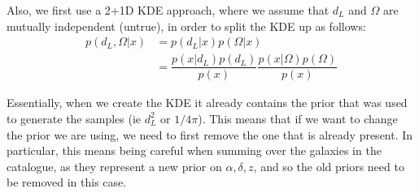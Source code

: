 \documentclass[a4paper,10pt]{article}
\begin{document}
Also, we first use a 2+1D KDE approach, where we assume that $d_L$ and $\Omega$ are mutually independent (untrue), in order to split the KDE up as follows:
\begin{equation}
\begin{aligned}
p(d_L,\Omega|x) &= p(d_L|x) p(\Omega|x)
\\ &= \dfrac{p(x|d_L) p(d_L)}{p(x)} \dfrac{p(x|\Omega) p(\Omega)}{p(x)}
\end{aligned}
\end{equation}

Essentially, when we create the KDE it already contains the prior that was used to generate the samples (ie $d_L^2$ or $1/4\pi$).  This means that if we want to change the prior we are using, we need to first remove the one that is already present.  In particular, this means being careful when summing over the galaxies in the catalogue, as they represent a new prior on $\alpha,\delta,z$, and so the old priors need to be removed in this case.
\end{document}
